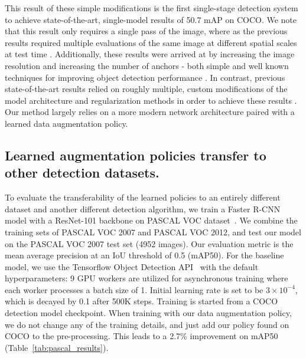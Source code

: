 \documentclass[10pt,twocolumn,letterpaper]{article}
\begin{document}
This result of these simple modifications is the first single-stage detection system to achieve state-of-the-art, single-model results of 50.7 mAP on COCO. We note that this result only requires a single pass of the image, where as the previous results required multiple evaluations of the same image at different spatial scales at test time \cite{Peng_2018_CVPR}. Additionally, these results were arrived at by increasing the image resolution and increasing the number of anchors - both simple and well known techniques for improving object detection performance \cite{yang2018metaanchor, huang2017speed}. In contrast, previous state-of-the-art results relied on roughly multiple, custom modifications of the model architecture and regularization methods in order to achieve these results \cite{Peng_2018_CVPR}. Our method largely relies on a more modern network architecture paired with a learned data augmentation policy. 



\subsection{Learned augmentation policies transfer to other detection datasets.}

To evaluate the transferability of the learned policies to an entirely different dataset and another different detection algorithm, we train a Faster R-CNN~\cite{ren2015faster} model with a ResNet-101 backbone on PASCAL VOC dataset~\cite{everingham2010pascal}. We combine the training sets of PASCAL VOC 2007 and PASCAL VOC 2012, and test our model on the PASCAL VOC 2007 test set (4952 images). Our evaluation metric is the mean average precision at an IoU threshold of 0.5 (mAP50). For the baseline model, we use the Tensorflow Object Detection API~\cite{huang2017speed} with the default hyperparameters: 9 GPU workers are utilized for asynchronous training where each worker processes a batch size of 1. Initial learning rate is set to be $3\times 10^{-4}$, which is decayed by 0.1 after 500K steps. Training is started from a COCO detection model checkpoint. When training with our data augmentation policy, we do not change any of the training details, and just add our policy found on COCO to the pre-processing. This leads to a 2.7\% improvement on mAP50 (Table~\ref{tab:pascal_results}). 
\end{document}
